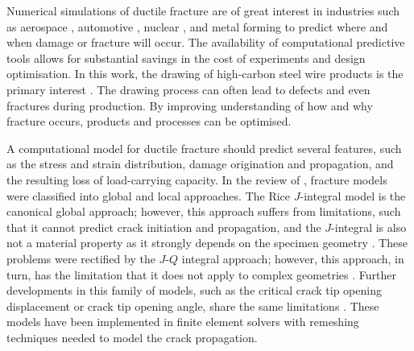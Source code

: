 \documentclass[sn-mathphys,Numbered]{sn-jnl}%
\begin{document}
Numerical simulations of ductile fracture are of great interest in industries such as aerospace \cite{riccio_damage_2015, johnson_numerical_2015}, automotive \cite{alharbi_damage_2015, sirinakorn_microstructure_2014, sarraf_mesoscale_2017, uthaisangsuk_characterisation_2009}, nuclear \cite{chen_modeling_2020}, and metal forming \cite{masse_study_2010, cao_models_2017, tekkaya_damage_2020, clancy_improving_2019, borchers_cold-drawn_2016, cardiff_lagrangian_2017} to predict where and when damage or fracture will occur.
The availability of computational predictive tools allows for substantial savings in the cost of experiments and design optimisation.
In this work, the drawing of high-carbon steel wire products is the primary interest \cite{clancy_improving_2019, borchers_cold-drawn_2016}.
The drawing process can often lead to defects and even fractures during production.
By improving understanding of how and why fracture occurs, products and processes can be optimised.

A computational model for ductile fracture should predict several features, such as the stress and strain distribution, damage origination and propagation, and the resulting loss of load-carrying capacity. %
In the review of \citet{besson_continuum_2010}, fracture models were classified into global and local approaches.
The Rice $J$-integral model is the canonical global approach; however, this approach suffers from limitations, such that it cannot predict crack initiation and propagation, and the $J$-integral is also not a material property as it strongly depends on the specimen geometry \cite{hackett_experimental_1993}.
These problems were rectified by the $J$-$Q$ integral approach; however, this approach, in turn, has the limitation that it does not apply to complex geometries \cite{odowd_family_1991}.
Further developments in this family of models, such as the critical crack tip opening displacement or crack tip opening angle, share the same limitations \cite{james_effect_2003, mahmoud_effect_2003}.
These models have been implemented in finite element solvers with remeshing techniques needed to model the crack propagation.
\end{document}
